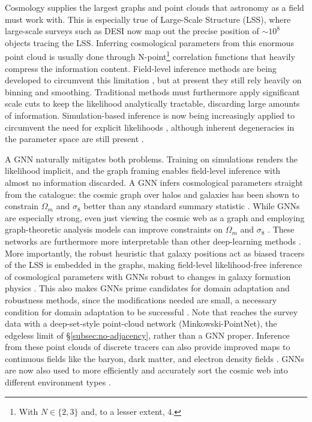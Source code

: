 \documentclass[graybox, envcountchap]{Template/svmult}
\begin{document}
Cosmology supplies the largest graphs and point clouds that astronomy as a field must work with. This is especially true of Large-Scale Structure (LSS), where large-scale surveys such as DESI now map out the precise position of $\sim10^{8}$ objects tracing the LSS. Inferring cosmological parameters from this enormous point cloud is usually done through N-point\footnote{With $N\in\{2,3\}$ and, to a lesser extent, $4$.} correlation functions that heavily compress the information content. Field-level inference methods are being developed to circumvent this limitation \citep{Bayer2023_MCLMC_fieldlevel}, but at present they still rely heavily on binning and smoothing. Traditional methods must furthermore apply significant scale cuts to keep the likelihood analytically tractable, discarding large amounts of information. Simulation-based inference is now being increasingly applied to circumvent the need for explicit likelihoods \citep{Hahn2023_SimBIG_forwardmodel, Hahn2024_SimBIG_constraints, Ho2024_LtU_ILI}, although inherent degeneracies in the parameter space are still present \citep{Krishnaraj2026_transferlearning}. 

A GNN naturally mitigates both problems. Training on simulations renders the likelihood implicit, and the graph framing enables field-level inference with almost no information discarded. A GNN infers cosmological parameters straight from the catalogue: the cosmic graph over halos and galaxies has been shown to constrain $\Omega_m$ and $\sigma_8$ better than any standard summary statistic \citep{Makinen2022_cosmicgraph_LSS, VillanuevaDomingo2022_cosmicgraph_clustering}. While GNNs are especially strong, even just viewing the cosmic web as a graph and employing graph-theoretic analysis models can improve constraints on $\Omega_m$ and $\sigma_8$ \citep{Yang2023_haloclustering_graph}. These networks are furthermore more interpretable than other deep-learning methods \citep{Shao2023_omegam_universalequation}. More importantly, the robust heuristic that galaxy positions act as biased tracers of the LSS is embedded in the graphs, making field-level likelihood-free inference of cosmological parameters with GNNs robust to changes in galaxy formation physics \citep[][Figure~\ref{fig:desanti_robustness}]{deSanti2023_fieldlevel_LFI}. This also makes GNNs prime candidates for domain adaptation and robustness methods, since the modifications needed are small, a necessary condition for domain adaptation to be successful \citep{Roncoli2023_domainadaptation_cosmology, Lee2024_SDSS_domaingeneralization}. Note that \citet{Lee2024_SDSS_domaingeneralization} reaches the survey data with a deep-set-style point-cloud network (Minkowski-PointNet), the edgeless limit of \S\ref{subsec:no-adjacency}, rather than a GNN proper. Inference from these point clouds of discrete tracers can also provide improved maps to continuous fields like the baryon, dark matter, and electron density fields \citep{Kvasiuk2024_fieldreconstruction_GNN, Krywonos2026_GNNCNN_reconstructing_DM_from_galaxies}. GNNs are now also used to more efficiently and accurately sort the cosmic web into different environment types \citep{Kololgi2025_cosmicweb_classification}. 
\end{document}
